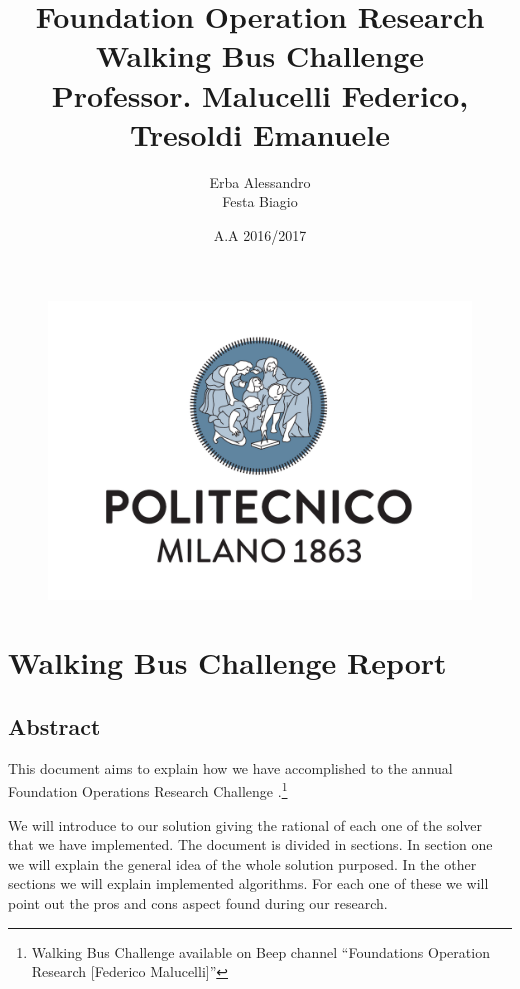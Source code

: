 \documentclass[english]{report}
\begin{document}
	\begin{figure}
		\centering
		\includegraphics[scale=0.5]{logo.pdf} 
	\end{figure}

	\title{Foundation Operation Research\\
		Walking Bus Challenge\\
		Professor. Malucelli Federico, Tresoldi Emanuele
	}

	\date{A.A 2016/2017}
	
	\author{Erba Alessandro\\
	Festa Biagio}
	
	\maketitle
	\pagebreak{}
	\tableofcontents{} \pagebreak{}

\chapter{Walking Bus Challenge Report}

\section{Abstract}
This document aims to explain how we have accomplished to the annual Foundation Operations Research Challenge .\footnote{Walking Bus Challenge available on Beep channel ``Foundations Operation Research [Federico Malucelli]''}
\par We will introduce to our solution giving the rational of each one of the solver that we have implemented.
The document is divided in sections. In section one we will explain the general idea of the whole solution purposed. 
In the other sections we will explain implemented algorithms. For each one of these we will point out the pros and cons aspect found during our research.
\end{document}
